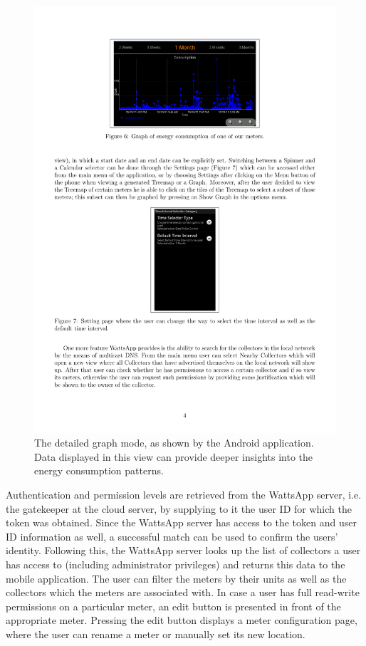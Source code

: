 \documentclass[10pt, conference, compsocconf]{IEEEtran}
\begin{document}
\begin{figure}[t]
\begin{centering}
\includegraphics[scale=0.78]{images/mobile-graph} 
\par\end{centering}

\caption{The detailed graph mode, as shown by the Android application. Data
displayed in this view can provide deeper insights into the energy
consumption patterns.\label{fig:graph-android}}
\end{figure}

Authentication and permission levels are retrieved from the WattsApp
server, i.e. the gatekeeper at the cloud server, by supplying to it
the user ID for which the token was obtained. Since the WattsApp server
has access to the token and user ID information as well, a successful
match can be used to confirm the users' identity. Following this,
the WattsApp server looks up the list of collectors a user has access
to (including administrator privileges) and returns this data to the
mobile application. The user can filter the meters by their units
as well as the collectors which the meters are associated with. In
case a user has full read-write permissions on a particular meter,
an edit button is presented in front of the appropriate meter. Pressing
the edit button displays a meter configuration page, where the user
can rename a meter or manually set its new location.
\end{document}
